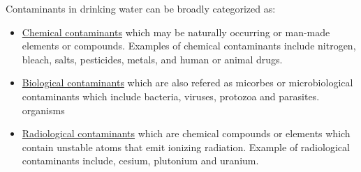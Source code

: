 Contaminants in drinking water can be broadly categorized as:
\begin{itemize}
\item \ul{Chemical contaminants}  which may be naturally occurring or man-made elements or compounds. Examples of chemical contaminants include nitrogen, bleach, salts, pesticides, metals, and human or animal drugs.
\item \ul{Biological contaminants}  which are also refered as micorbes or microbiological contaminants which include bacteria, viruses, protozoa and parasites.
organisms
\item \ul{Radiological contaminants}  which are chemical compounds or elements which contain unstable atoms that emit ionizing radiation.  Example of radiological contaminants include, cesium, plutonium and uranium.
\end{itemize}

